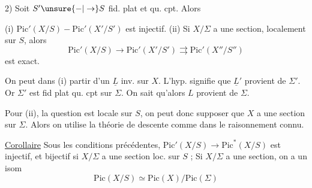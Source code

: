 2) Soit $S'\unsure{-|\to}S$ fid. plat et qu. cpt. Alors

(i) $\mathrm{Pic}'(X/S)-\mathrm{Pic}'(X'/S')$ est injectif. (ii) Si $X/\Sigma$ a  une section,  localement sur $S$, alors
\[
\mathrm{Pic}'(X/S)\to\mathrm{Pic}'(X'/S')\rightrightarrows\mathrm{Pic}'(X''/S'')
\]
est exact.

On peut dans (i) partir d'un $\underline L$ inv. sur $X$.  L'hyp. signifie que $\underline L'$ provient de $\Sigma'$. Or $\Sigma'$ est fid plat qu. cpt sur $\Sigma$. On sait qu'alors  $L$ provient de $\Sigma$.

Pour (ii),  la question est locale sur $S$, on peut donc supposer que $X$ a une section sur $\Sigma$. Alors on utilise la théorie de descente comme dans le raisonnement connu.

\uline{Corollaire}  Sous les conditions précédentes, $\mathrm{Pic}'(X/S)\to\mathrm{Pic}^{*}(X/S)$ est injectif, et  bijectif si $X/\Sigma$  a une section loc. sur $S$ ; Si $X/\Sigma$ a  une section, on a un isom
\[
\mathrm{Pic}(X/S)\simeq\mathrm{Pic}(X)/\mathrm{Pic}(\Sigma)
\]

